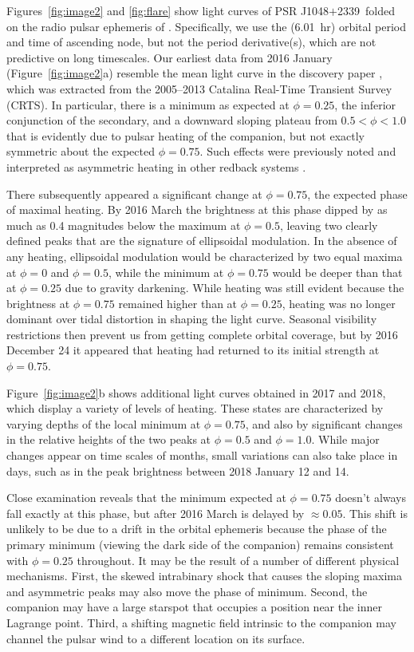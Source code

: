 \documentclass[iop]{emulateapj}
\newcommand{\msptwo}{PSR J1048$+$2339}
\begin{document}
Figures~\ref{fig:image2} and \ref{fig:flare} show light curves of
\msptwo\ folded on the radio pulsar ephemeris of \citet{den16}.
Specifically, we use the (6.01~hr) orbital period and time of ascending node,
but not the period derivative(s), which are not predictive
on long timescales.  Our earliest data from 2016 January
(Figure~\ref{fig:image2}a) resemble the mean light curve in the
discovery paper \citep{den16}, which was extracted from the 2005--2013 
Catalina Real-Time Transient Survey (CRTS).  In particular,
there is a minimum as expected at $\phi=0.25$, the inferior conjunction
of the secondary, and a downward sloping plateau from $0.5<\phi<1.0$ 
that is evidently due to pulsar heating of the companion, but not exactly
symmetric about the expected $\phi=0.75$.  Such effects were previously
noted and interpreted as asymmetric heating in other redback systems
\citep{wou04,li14,hal17b}. 

There subsequently appeared a significant change at $\phi=0.75$,
the expected phase of maximal heating.  By 2016 March the brightness
at this phase dipped by as much as 0.4 magnitudes below the maximum at 
$\phi=0.5$, leaving two clearly defined peaks that are the signature
of ellipsoidal modulation.  In the absence of any heating, ellipsoidal
modulation would be characterized by two equal maxima at $\phi=0$
and $\phi=0.5$, while the minimum at $\phi=0.75$ would be deeper than
that at $\phi=0.25$ due to gravity darkening. While heating was still
evident because the brightness at $\phi=0.75$ remained 
higher than at $\phi=0.25$, heating was no longer dominant over tidal
distortion in shaping the light curve.  Seasonal visibility restrictions
then prevent us from getting complete orbital coverage, but by
2016 December 24 it appeared that heating had returned to its initial
strength at $\phi=0.75$.

Figure~\ref{fig:image2}b shows additional light curves obtained in
2017 and 2018, which display a variety of levels of heating.  These
states are characterized by varying depths of the local minimum
at $\phi=0.75$, and also by significant changes in the relative
heights of the two peaks at $\phi=0.5$ and $\phi=1.0$.  While
major changes appear on time scales of months, small variations
can also take place in days, such as in the peak brightness
between 2018 January 12 and 14.

Close examination reveals that the minimum expected at $\phi=0.75$ doesn't
always fall exactly at this phase, but after 2016 March
is delayed by $\approx0.05$.   This shift is unlikely to be due to a
drift in the orbital ephemeris because the phase of the primary 
minimum (viewing the dark side of the companion) remains consistent
with $\phi=0.25$ throughout.  It may be the result of a number of 
different physical mechanisms.  First, the skewed intrabinary
shock that causes the sloping maxima and asymmetric peaks may
also move the phase of minimum. 
Second, the companion may have a large starspot that occupies a
position near the inner Lagrange point.  Third, a shifting magnetic
field intrinsic to the companion may channel the pulsar wind to
a different location on its surface. 
\end{document}
